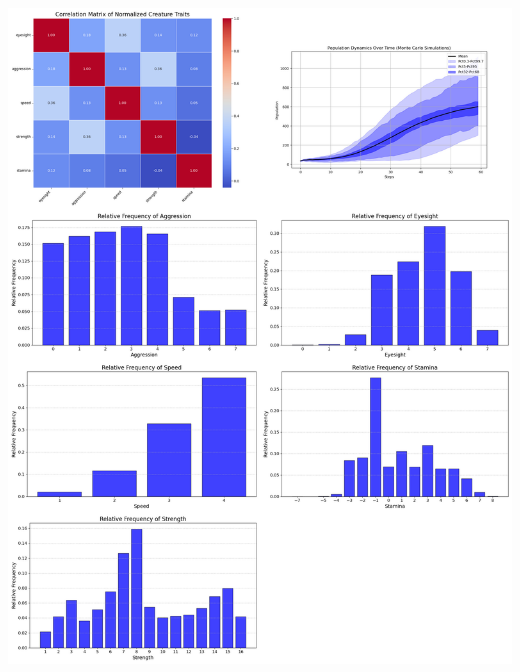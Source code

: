 \documentclass{article}
\begin{document}
\begin{center}
    \includegraphics[scale=0.21]{tests/2.7.jpg}
\end{center}
\end{document}
